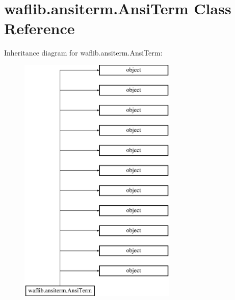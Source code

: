 \hypertarget{classwaflib_1_1ansiterm_1_1_ansi_term}{}\section{waflib.\+ansiterm.\+Ansi\+Term Class Reference}
\label{classwaflib_1_1ansiterm_1_1_ansi_term}
Inheritance diagram for waflib.\+ansiterm.\+Ansi\+Term\+:\begin{figure}[H]
\begin{center}
\leavevmode
\includegraphics[height=12.000000cm]{classwaflib_1_1ansiterm_1_1_ansi_term}
\end{center}
\end{figure}
